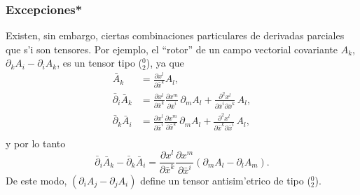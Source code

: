 \subsubsection{Excepciones*}
Existen, sin embargo, ciertas combinaciones particulares de derivadas parciales que s'i son tensores. Por ejemplo, el ``rotor'' de un campo vectorial covariante $A_k $, $\partial_k A_i-\partial_iA_k $, es un tensor tipo ($_2^0$), ya que
\begin{align}
\bar{A}_k  & =\frac{\partial x^l}{\partial\bar{x}^k} A_l ,\label{ord6}\\
\bar{\partial}_i\bar{A}_k  & =\frac{\partial x^l}{\partial\bar{x}^k} 
\frac{\partial x^m}{\partial\bar{x}^i}\, \partial_mA_l +
\frac{\partial^2 x^l}{\partial\bar{x}^i\partial\bar{x}^k}\, A_l ,\\
\bar{\partial}_k \bar{A}_i & =\frac{\partial x^l}{\partial\bar{x}^i}
\frac{\partial x^m}{\partial\bar{x}^k}\, \partial_mA_l +
\frac{\partial^2 x^l}{\partial\bar{x}^k\partial\bar{x}^i}\, A_l ,\\
\end{align}
y por lo tanto
\begin{equation}
 \bar{\partial}_i\bar{A}_k -\bar{\partial}_k \bar{A}_i =\frac{\partial x^l}{\partial\bar{x}^k} \frac{\partial x^m}{\partial\bar{x}^i} \left( \partial_m A_l -\partial_l A_m\right) .
\end{equation}
De este modo, $\left(\partial_iA_j -\partial_j A_i\right)$ define un tensor
antisim'etrico de tipo ($_2^0$).

